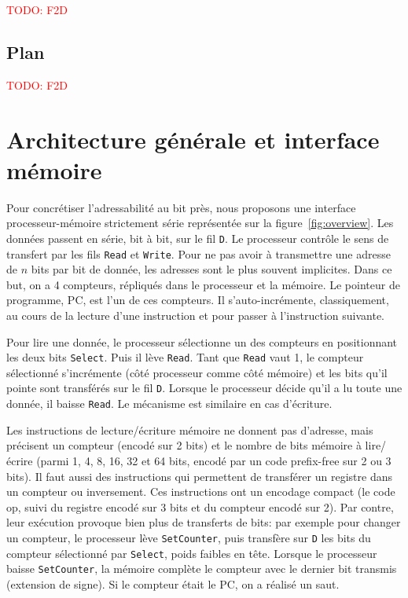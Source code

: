 \documentclass[architecture]{compas2018}
\newcommand{\todo}[1]{\textcolor{red}{TODO: #1}}
\begin{document}
\todo{F2D}
\subsection{Plan}

\todo{F2D}
\fi


\section{Architecture générale et interface mémoire}
Pour concrétiser l'adressabilité au bit près, nous proposons une interface processeur-mémoire strictement série représentée sur la figure~\ref{fig:overview}.
Les données passent en série, bit à bit, sur le fil \texttt{D}.
Le processeur contrôle le sens de transfert par les fils \texttt{Read} et \texttt{Write}.
Pour ne pas avoir à transmettre une adresse de $n$ bits par bit de donnée, les adresses sont le plus souvent implicites.
Dans ce but, on a 4 compteurs, répliqués dans le processeur et la mémoire.
Le pointeur de programme, PC, est l'un de ces compteurs.
Il s'auto-incrémente, classiquement, au cours de la lecture d'une instruction et pour passer à l'instruction suivante.

Pour lire une donnée, le processeur sélectionne un des compteurs en positionnant les deux bits  \texttt{Select}.
Puis il lève \texttt{Read}.
Tant que \texttt{Read} vaut 1, le compteur sélectionné s'incrémente (côté processeur comme côté mémoire) et les bits qu'il pointe sont transférés sur le fil \texttt{D}.
Lorsque le processeur décide qu'il a lu toute une donnée, il baisse \texttt{Read}.
Le mécanisme est similaire en cas d'écriture.

Les instructions de lecture/écriture mémoire ne donnent pas d'adresse, mais précisent un compteur (encodé sur 2 bits) et le nombre de bits mémoire à lire/écrire (parmi 1, 4, 8, 16, 32 et 64 bits, encodé par un code prefix-free sur 2 ou 3 bits).
Il faut aussi des instructions qui permettent de transférer un registre dans un compteur ou inversement.
Ces instructions ont un encodage compact (le code op, suivi du registre encodé sur 3 bits et du compteur encodé sur 2).
Par contre, leur exécution provoque bien plus de transferts de bits: par exemple pour changer un compteur, le processeur lève \texttt{SetCounter}, puis transfère sur \texttt{D} les bits du compteur sélectionné par \texttt{Select}, poids faibles en tête.
Lorsque le processeur baisse \texttt{SetCounter}, la mémoire complète le compteur avec le dernier bit transmis (extension de signe).
Si le compteur était le PC, on a réalisé un saut.
\end{document}
